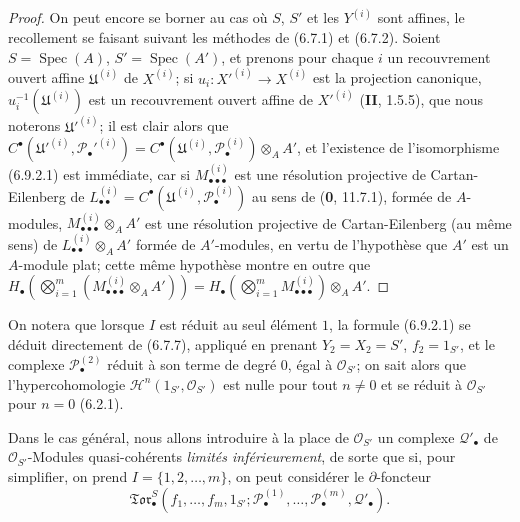 \begin{proof}
On peut encore se borner au cas où $S$, $S'$ et les $Y^{(i)}$ sont affines,
le recollement se faisant suivant les méthodes de (6.7.1) et (6.7.2). Soient
$S=\operatorname{Spec}(A)$, $S'=\operatorname{Spec}(A')$, et prenons pour
chaque $i$ un recouvrement ouvert affine $\mathfrak U^{(i)}$ de $X^{(i)}$;
si $u_i:X'^{(i)}\to X^{(i)}$ est la projection canonique,
$u_i^{-1}(\mathfrak U^{(i)})$ est un recouvrement ouvert affine de
$X'^{(i)}$ (\textbf{II}, 1.5.5), que nous noterons $\mathfrak U'^{(i)}$; il est clair
alors que
$C^\bullet(\mathfrak U'^{(i)},\mathscr P_\bullet'^{(i)})
=C^\bullet(\mathfrak U^{(i)},\mathscr P_\bullet^{(i)})\otimes_A A'$,
et l'existence de l'isomorphisme (6.9.2.1) est immédiate, car si
$M_{\bullet\bullet\bullet}^{(i)}$ est une résolution projective de
Cartan-Eilenberg de
$L_{\bullet\bullet}^{(i)}=C^\bullet(\mathfrak U^{(i)},
\mathscr P_\bullet^{(i)})$ au sens de (\textbf{0}, 11.7.1), formée de $A$-modules,
$M_{\bullet\bullet\bullet}^{(i)}\otimes_A A'$ est une résolution projective
de Cartan-Eilenberg (au même sens) de
$L_{\bullet\bullet}^{(i)}\otimes_A A'$ formée de $A'$-modules, en vertu de
l'hypothèse que $A'$ est un $A$-module plat; cette même hypothèse montre en
outre que
$H_\bullet(\bigotimes_{i=1}^m(M_{\bullet\bullet\bullet}^{(i)}\otimes_A A'))
=H_\bullet(\bigotimes_{i=1}^m M_{\bullet\bullet\bullet}^{(i)})\otimes_A A'$.
\end{proof}

On notera que lorsque $I$ est réduit au seul élément $1$, la formule
(6.9.2.1) se déduit directement de (6.7.7), appliqué en prenant
$Y_2=X_2=S'$, $f_2=1_{S'}$, et le complexe $\mathscr P_\bullet^{(2)}$
réduit à son terme de degré $0$, égal à $\mathscr O_{S'}$; on sait alors que
l'hypercohomologie $\mathscr H^n(1_{S'},\mathscr O_{S'})$ est nulle pour tout
$n\ne0$ et se réduit à $\mathscr O_{S'}$ pour $n=0$ (6.2.1).

Dans le cas général, nous allons introduire à la place de $\mathscr O_{S'}$
un complexe $\mathscr Q'_\bullet$ de $\mathscr O_{S'}$-Modules
quasi-cohérents \emph{limités inférieurement}, de sorte que si, pour simplifier, on
prend $I=\{1,2,\ldots,m\}$, on peut considérer le $\partial$-foncteur
\[
  \mathfrak{Tor}_\bullet^S
  (f_1,\ldots,f_m,1_{S'};
   \mathscr P_\bullet^{(1)},\ldots,\mathscr P_\bullet^{(m)},
   \mathscr Q'_\bullet).
\]

